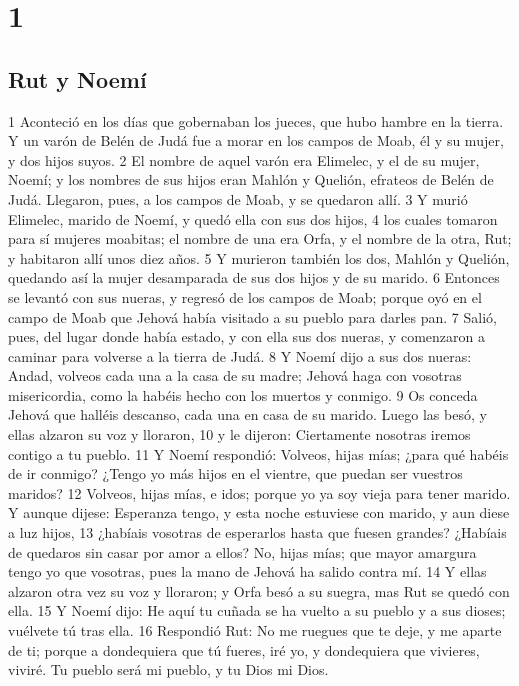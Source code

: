 
\chapter{1}

\section*{Rut y Noemí}

1 Aconteció en los días que gobernaban los jueces, que hubo hambre en la tierra. Y un varón de Belén de Judá fue a morar en los campos de Moab, él y su mujer, y dos hijos suyos.
2 El nombre de aquel varón era Elimelec, y el de su mujer, Noemí; y los nombres de sus hijos eran Mahlón y Quelión, efrateos de Belén de Judá. Llegaron, pues, a los campos de Moab, y se quedaron allí.
3 Y murió Elimelec, marido de Noemí, y quedó ella con sus dos hijos,
4 los cuales tomaron para sí mujeres moabitas; el nombre de una era Orfa, y el nombre de la otra, Rut; y habitaron allí unos diez años.
5 Y murieron también los dos, Mahlón y Quelión, quedando así la mujer desamparada de sus dos hijos y de su marido.
6 Entonces se levantó con sus nueras, y regresó de los campos de Moab; porque oyó en el campo de Moab que Jehová había visitado a su pueblo para darles pan.
7 Salió, pues, del lugar donde había estado, y con ella sus dos nueras, y comenzaron a caminar para volverse a la tierra de Judá.
8 Y Noemí dijo a sus dos nueras: Andad, volveos cada una a la casa de su madre; Jehová haga con vosotras misericordia, como la habéis hecho con los muertos y conmigo.
9 Os conceda Jehová que halléis descanso, cada una en casa de su marido. Luego las besó, y ellas alzaron su voz y lloraron,
10 y le dijeron: Ciertamente nosotras iremos contigo a tu pueblo.
11 Y Noemí respondió: Volveos, hijas mías; ¿para qué habéis de ir conmigo? ¿Tengo yo más hijos en el vientre, que puedan ser vuestros maridos?
12 Volveos, hijas mías, e idos; porque yo ya soy vieja para tener marido. Y aunque dijese: Esperanza tengo, y esta noche estuviese con marido, y aun diese a luz hijos,
13 ¿habíais vosotras de esperarlos hasta que fuesen grandes? ¿Habíais de quedaros sin casar por amor a ellos? No, hijas mías; que mayor amargura tengo yo que vosotras, pues la mano de Jehová ha salido contra mí.
14 Y ellas alzaron otra vez su voz y lloraron; y Orfa besó a su suegra, mas Rut se quedó con ella.
15 Y Noemí dijo: He aquí tu cuñada se ha vuelto a su pueblo y a sus dioses; vuélvete tú tras ella.
16 Respondió Rut: No me ruegues que te deje, y me aparte de ti; porque a dondequiera que tú fueres, iré yo, y dondequiera que vivieres, viviré. Tu pueblo será mi pueblo, y tu Dios mi Dios.
